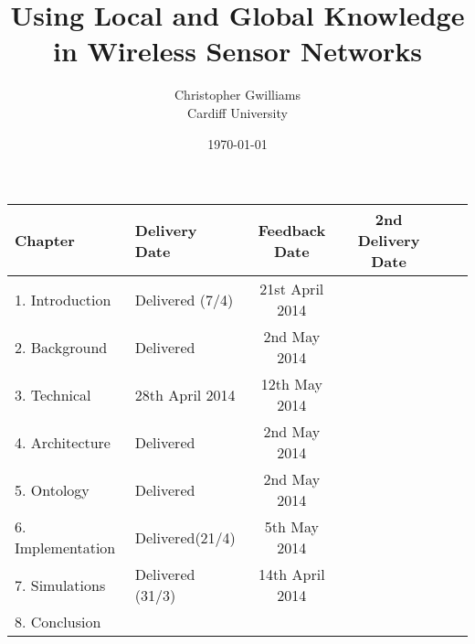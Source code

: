 \documentclass[12pt, a4paper]{report}
\begin{document}
\title{Using Local and Global Knowledge in Wireless Sensor Networks}
\author{Christopher Gwilliams\\Cardiff University}
\date{\today}
\maketitle 

		\begin{table*}
			\hfill{}
			\begin{tabular}{|l|l|c|c|c|c|}
				\hline
					Chapter & Delivery Date & Feedback Date & 2nd Delivery Date \\
				\hline
					1. Introduction & Delivered (7/4) & 21st April 2014 & \\
					2. Background & Delivered & 2nd May 2014 & \\
					3. Technical & 28th April 2014 & 12th May 2014 & \\
					4. Architecture & Delivered & 2nd May 2014 & \\
					5. Ontology & Delivered & 2nd May 2014 & \\
					6. Implementation & Delivered(21/4) & 5th May 2014 & \\
					7. Simulations & Delivered (31/3) & 14th April 2014 & \\
					8. Conclusion & & & \\			
				\hline
			\end{tabular}
			\hfill{}
		\end{table*}		

\tableofcontents
\listoffigures
\listoftables
\end{document}
